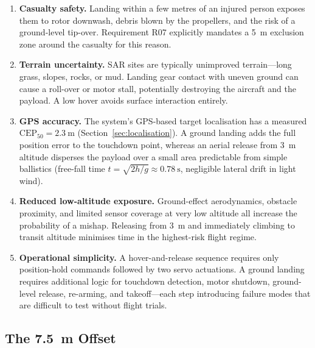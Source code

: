 \begin{enumerate}
    \item \textbf{Casualty safety.} Landing within a few metres of an injured person exposes them to rotor downwash, debris blown by the propellers, and the risk of a ground-level tip-over. Requirement R07 explicitly mandates a \SI{5}{\metre} exclusion zone around the casualty for this reason.

    \item \textbf{Terrain uncertainty.} SAR sites are typically unimproved terrain---long grass, slopes, rocks, or mud. Landing gear contact with uneven ground can cause a roll-over or motor stall, potentially destroying the aircraft and the payload. A low hover avoids surface interaction entirely.

    \item \textbf{GPS accuracy.} The system's GPS-based target localisation has a measured $\text{CEP}_{50} = \SI{2.3}{\metre}$ (Section~\ref{sec:localisation}). A ground landing adds the full position error to the touchdown point, whereas an aerial release from \SI{3}{\metre} altitude disperses the payload over a small area predictable from simple ballistics (free-fall time $t = \sqrt{2h/g} \approx \SI{0.78}{\second}$, negligible lateral drift in light wind).

    \item \textbf{Reduced low-altitude exposure.} Ground-effect aerodynamics, obstacle proximity, and limited sensor coverage at very low altitude all increase the probability of a mishap. Releasing from \SI{3}{\metre} and immediately climbing to transit altitude minimises time in the highest-risk flight regime.

    \item \textbf{Operational simplicity.} A hover-and-release sequence requires only position-hold commands followed by two servo actuations. A ground landing requires additional logic for touchdown detection, motor shutdown, ground-level release, re-arming, and takeoff---each step introducing failure modes that are difficult to test without flight trials.
\end{enumerate}

\subsection{The \SI{7.5}{\metre} Offset}\label{sec:offset-rationale}

